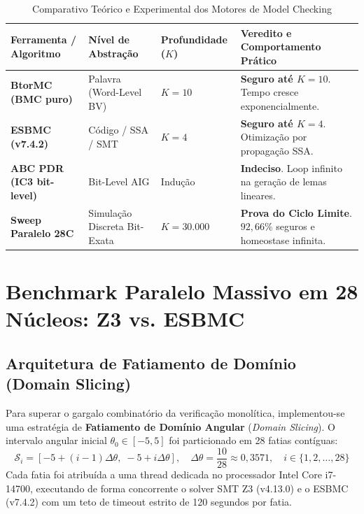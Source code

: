 \documentclass[11pt,a4paper]{article}
\theoremstyle{definition}
\begin{document}
\begin{table}[!ht]
\centering
\small
\caption{Comparativo Teórico e Experimental dos Motores de Model Checking}
\label{tab:comparativo_motores}
\vspace{0.15cm}
\begin{tabularx}{\textwidth}{l l l X}
\toprule
\textbf{Ferramenta / Algoritmo} & \textbf{Nível de Abstração} & \textbf{Profundidade ($K$)} & \textbf{Veredito e Comportamento Prático} \\
\midrule
\textbf{BtorMC (BMC puro)} & Palavra (Word-Level BV) & $K = 10$ & \textbf{Seguro até $K=10$}. Tempo cresce exponencialmente. \\
\textbf{ESBMC (v7.4.2)} & Código / SSA / SMT & $K = 4$ & \textbf{Seguro até $K=4$}. Otimização por propagação SSA. \\
\textbf{ABC PDR (IC3 bit-level)} & Bit-Level AIG & Indução & \textbf{Indeciso}. Loop infinito na geração de lemas lineares. \\
\textbf{Sweep Paralelo 28C} & Simulação Discreta Bit-Exata & $K = 30.000$ & \textbf{Prova do Ciclo Limite}. $92{,}66\%$ seguros e homeostase infinita. \\
\bottomrule
\end{tabularx}
\end{table}

\section{Benchmark Paralelo Massivo em 28 Núcleos: Z3 vs. ESBMC}

\subsection{Arquitetura de Fatiamento de Domínio (Domain Slicing)}

Para superar o gargalo combinatório da verificação monolítica, implementou-se uma estratégia de \textbf{Fatiamento de Domínio Angular} (\textit{Domain Slicing}). O intervalo angular inicial $\theta_0 \in [-5, 5]$ foi particionado em 28 fatias contíguas:
\begin{equation}
    \mathcal{S}_i = \left[ -5 + (i-1)\Delta\theta, \; -5 + i\Delta\theta \right], \quad \Delta\theta = \frac{10}{28} \approx 0{,}3571, \quad i \in \{1, 2, \dots, 28\}
\end{equation}
Cada fatia foi atribuída a uma thread dedicada no processador Intel Core i7-14700, executando de forma concorrente o solver SMT Z3 (v4.13.0) e o ESBMC (v7.4.2) com um teto de timeout estrito de 120 segundos por fatia.
\end{document}
